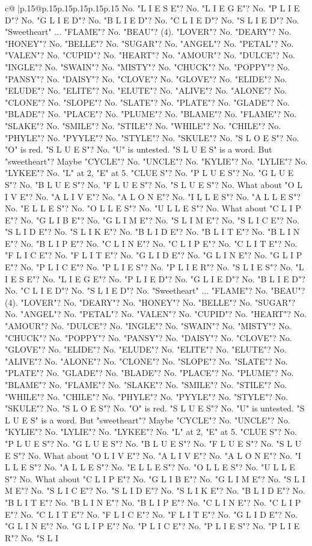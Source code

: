 \documentclass{article}
\begin{document}
{\begin{supertabular}{c@{$\;$}|p{.15\linewidth}@{}p{.15\linewidth}p{.15\linewidth}p{.15\linewidth}p{.15\linewidth}p{.15\linewidth}}
{{{No. "L I E S E"? No. "L I E G E"? No. "P L I E D"? No. "G L I E D"? No. "B L I E D"? No. "C L I E D"? No. "S L I E D"? No. "Sweetheart" ... "FLAME"? No. "BEAU"? (4). "LOVER"? No. "DEARY"? No. "HONEY"? No. "BELLE"? No. "SUGAR"? No. "ANGEL"? No. "PETAL"? No. "VALEN"? No. "CUPID"? No. "HEART"? No. "AMOUR"? No. "DULCE"? No. "INGLE"? No. "SWAIN"? No. "MISTY"? No. "CHUCK"? No. "POPPY"? No. "PANSY"? No. "DAISY"? No. "CLOVE"? No. "GLOVE"? No. "ELIDE"? No. "ELUDE"? No. "ELITE"? No. "ELUTE"? No. "ALIVE"? No. "ALONE"? No. "CLONE"? No. "SLOPE"? No. "SLATE"? No. "PLATE"? No. "GLADE"? No. "BLADE"? No. "PLACE"? No. "PLUME"? No. "BLAME"? No. "FLAME"? No. "SLAKE"? No. "SMILE"? No. "STILE"? No. "WHILE"? No. "CHILE"? No. "PHYLE"? No. "PYYLE"? No. "STYLE"? No. "SKULE"? No. "S L O E S"? No. "O" is red. "S L U E S"? No. "U" is untested. "S L U E S" is a word. But "sweetheart"? Maybe "CYCLE"? No. "UNCLE"? No. "KYLIE"? No. "LYLIE"? No. "LYKEE"? No. "L" at 2, "E" at 5. "CLUE S"? No. "P L U E S"? No. "G L U E S"? No. "B L U E S"? No. "F L U E S"? No. "S L U E S"? No. What about "O L I V E"? No. "A L I V E"? No. "A L O N E"? No. "I L L E S"? No. "A L L E S"? No. "E L L E S"? No. "O L L E S"? No. "U L L E S"? No. What about "C L I P E"? No. "G L I B E"? No. "G L I M E"? No. "S L I M E"? No. "S L I C E"? No. "S L I D E"? No. "S L I K E"? No. "B L I D E"? No. "B L I T E"? No. "B L I N E"? No. "B L I P E"? No. "C L I N E"? No. "C L I P E"? No. "C L I T E"? No. "F L I C E"? No. "F L I T E"? No. "G L I D E"? No. "G L I N E"? No. "G L I P E"? No. "P L I C E"? No. "P L I E S"? No. "P L I E R"? No. "S L I E S"? No. "L I E S E"? No. "L I E G E"? No. "P L I E D"? No. "G L I E D"? No. "B L I E D"? No. "C L I E D"? No. "S L I E D"? No. "Sweetheart" ... "FLAME"? No. "BEAU"? (4). "LOVER"? No. "DEARY"? No. "HONEY"? No. "BELLE"? No. "SUGAR"? No. "ANGEL"? No. "PETAL"? No. "VALEN"? No. "CUPID"? No. "HEART"? No. "AMOUR"? No. "DULCE"? No. "INGLE"? No. "SWAIN"? No. "MISTY"? No. "CHUCK"? No. "POPPY"? No. "PANSY"? No. "DAISY"? No. "CLOVE"? No. "GLOVE"? No. "ELIDE"? No. "ELUDE"? No. "ELITE"? No. "ELUTE"? No. "ALIVE"? No. "ALONE"? No. "CLONE"? No. "SLOPE"? No. "SLATE"? No. "PLATE"? No. "GLADE"? No. "BLADE"? No. "PLACE"? No. "PLUME"? No. "BLAME"? No. "FLAME"? No. "SLAKE"? No. "SMILE"? No. "STILE"? No. "WHILE"? No. "CHILE"? No. "PHYLE"? No. "PYYLE"? No. "STYLE"? No. "SKULE"? No. "S L O E S"? No. "O" is red. "S L U E S"? No. "U" is untested. "S L U E S" is a word. But "sweetheart"? Maybe "CYCLE"? No. "UNCLE"? No. "KYLIE"? No. "LYLIE"? No. "LYKEE"? No. "L" at 2, "E" at 5. "CLUE S"? No. "P L U E S"? No. "G L U E S"? No. "B L U E S"? No. "F L U E S"? No. "S L U E S"? No. What about "O L I V E"? No. "A L I V E"? No. "A L O N E"? No. "I L L E S"? No. "A L L E S"? No. "E L L E S"? No. "O L L E S"? No. "U L L E S"? No. What about "C L I P E"? No. "G L I B E"? No. "G L I M E"? No. "S L I M E"? No. "S L I C E"? No. "S L I D E"? No. "S L I K E"? No. "B L I D E"? No. "B L I T E"? No. "B L I N E"? No. "B L I P E"? No. "C L I N E"? No. "C L I P E"? No. "C L I T E"? No. "F L I C E"? No. "F L I T E"? No. "G L I D E"? No. "G L I N E"? No. "G L I P E"? No. "P L I C E"? No. "P L I E S"? No. "P L I E R"? No. "S L I }}}
\end{supertabular}}
\end{document}
